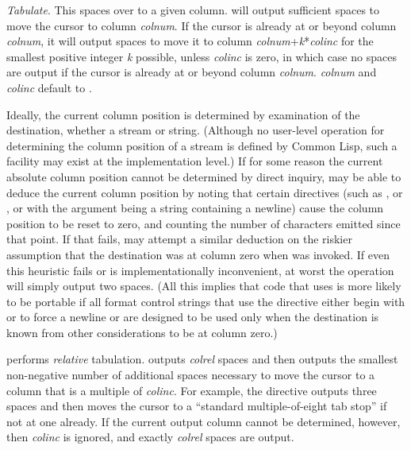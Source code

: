 \begin{flushdesc}
\item[\cd{{\Xtilde}T}]
\emph{Tabulate}.
This spaces over to a given column.
 will output
sufficient spaces to move the cursor to column \emph{colnum}.  If the cursor
is already at or beyond column \emph{colnum}, it will output spaces to move it to
column \emph{colnum}+\emph{k}*\emph{colinc} for the smallest positive integer
\emph{k} possible, unless \emph{colinc} is zero, in which case no spaces
are output if the cursor is already at or beyond column \emph{colnum}.
\emph{colnum} and \emph{colinc} default to .

Ideally, the current column position is determined by examination of the
destination, whether a stream or string. (Although no user-level
operation for determining the column position of a stream is defined
by Common Lisp, such a facility may exist at the implementation level.)
If for some reason the current absolute column position cannot be determined
by direct inquiry,
 may be able to deduce the current column position by noting
that certain directives (such as \cd{{\Xtilde}\%}, or \cd{{\Xtilde}\&},
or  with the argument being a string containing a newline) cause
the column position to be reset to zero, and counting the number of characters
emitted since that point.  If that fails,  may attempt a
similar deduction on the riskier assumption that the destination was
at column zero when  was invoked.  If even this heuristic fails
or is implementationally inconvenient, at worst
the  operation will simply output two spaces.
(All this implies that code that uses  is
more likely to be portable if all format control strings that use 
the  directive either begin with \cd{{\Xtilde}\%} or \cd{{\Xtilde}\&}
to force a newline
or are designed to be used only when the destination is known from other
considerations to be at column zero.)

 performs \emph{relative} tabulation.
 outputs \emph{colrel} spaces
and then outputs the smallest non-negative
number of additional spaces necessary to move the cursor
to a column that is a multiple
of \emph{colinc}.  For example, the directive  outputs
three spaces and then moves the cursor to a ``standard multiple-of-eight
tab stop'' if not at one already.
If the current output column cannot be determined, however,
then \emph{colinc} is ignored, and exactly \emph{colrel} spaces are output.


\end{flushdesc}
